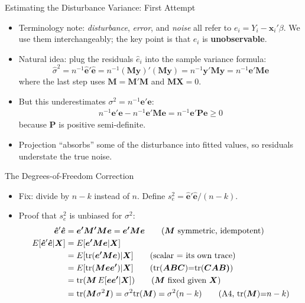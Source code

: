 \documentclass[aspectratio=169, handout]{beamer}
\numberwithin{equation}{section}
\begin{document}
\begin{frame}{Estimating the Disturbance Variance: First Attempt}
\small
\begin{itemize}
\item Terminology note: \emph{disturbance}, \emph{error}, and \emph{noise} all refer to $e_i = Y_i - \bm{x}_i'\beta$. We use them interchangeably; the key point is that $e_i$ is \textbf{unobservable}.\pause
\item Natural idea: plug the residuals $\hat{e}_i$ into the sample variance formula:
$$\hat{\sigma}^2=n^{-1}\bm{\hat{e}'\hat{e}}=n^{-1}(\bm{My})'(\bm{My})=n^{-1}\bm{y'My}=n^{-1}\bm{e'Me}$$
where the last step uses $\bm{M}=\bm{M'M}$ and $\bm{MX}=0$.\pause
\item But this underestimates $\sigma^2 = n^{-1}\bm{e'e}$:
\begin{align*}
n^{-1}\bm{e'e}-n^{-1}\bm{e'Me}=n^{-1}\bm{e'Pe}\geq 0
\end{align*}
because $\bm{P}$ is positive semi-definite.
\item Projection ``absorbs'' some of the disturbance into fitted values, so residuals understate the true noise.
\end{itemize}
\end{frame}


\begin{frame}{The Degrees-of-Freedom Correction}
\small
\begin{itemize}
\item Fix: divide by $n-k$ instead of $n$. Define $s^2_e=\bm{\hat{e}}'\bm{\hat{e}}/(n-k)$.
\item Proof that $s^2_e$ is unbiased for $\sigma^2$:
\begin{align*}
\bm{\hat{e}}'\bm{\hat{e}}&=\bm{e'M'Me}=\bm{e'Me} \tag{$\bm{M}$ symmetric, idempotent}\\
E[\bm{\hat{e}}'\bm{\hat{e}}|\bm{X}]&=E[\bm{e'Me}|\bm{X}]\\
&=E[\text{tr}(\bm{e'Me})|\bm{X}] \tag{scalar $=$ its own trace}\\
&=E[\text{tr}(\bm{Mee'})|\bm{X}] \tag{tr($\bm{ABC}$)=tr($\bm{CAB)}$}\\
&=\text{tr}(\bm{M}\, E[\bm{ee'}|\bm{X}]) \tag{$\bm{M}$ fixed given $\bm{X}$}\\
&=\text{tr}(\bm{M}\sigma^2\bm{I})=\sigma^2\text{tr}(\bm{M})=\sigma^2 (n-k) \tag{A4, tr($\bm{M}$)=$n-k$}
\end{align*}
\end{itemize}
\end{frame}
\end{document}

